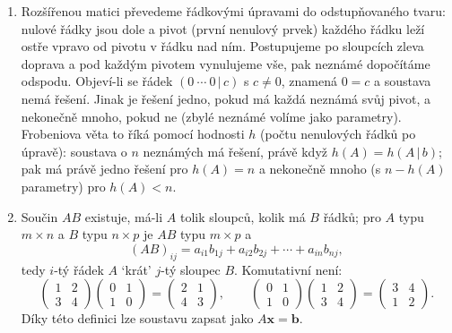\begin{enumerate}[label=\textbf{\arabic*.}, leftmargin=*, itemsep=0.8em]
  \item {}
  Rozšířenou matici převedeme řádkovými úpravami do odstupňovaného tvaru: nulové řádky jsou dole a pivot (první nenulový prvek) každého řádku leží ostře vpravo od pivotu v řádku nad ním. Postupujeme po sloupcích zleva doprava a pod každým pivotem vynulujeme vše, pak neznámé dopočítáme odspodu. Objeví-li se řádek $(0\ \cdots\ 0\,|\,c)$ s $c\neq 0$, znamená $0 = c$ a soustava nemá řešení. Jinak je řešení jedno, pokud má každá neznámá svůj pivot, a nekonečně mnoho, pokud ne (zbylé neznámé volíme jako parametry). Frobeniova věta to říká pomocí hodnosti $h$ (počtu nenulových řádků po úpravě): soustava o $n$ neznámých má řešení, právě když $h(A) = h(A\,|\,b)$; pak má právě jedno řešení pro $h(A) = n$ a nekonečně mnoho (s $n - h(A)$ parametry) pro $h(A) < n$. 

  \item {}
  Součin $AB$ existuje, má-li $A$ tolik sloupců, kolik má $B$ řádků; pro $A$ typu $m\times n$ a $B$ typu $n\times p$ je $AB$ typu $m\times p$ a
  \begin{equation*}
    (AB)_{ij} = a_{i1}b_{1j} + a_{i2}b_{2j} + \cdots + a_{in}b_{nj},
  \end{equation*}
  tedy $i$-tý řádek $A$ `krát' $j$-tý sloupec $B$. Komutativní není:
  \begin{equation*}
    \begin{pmatrix} 1 & 2\\ 3 & 4 \end{pmatrix}\begin{pmatrix} 0 & 1\\ 1 & 0 \end{pmatrix} = \begin{pmatrix} 2 & 1\\ 4 & 3 \end{pmatrix}, \qquad
    \begin{pmatrix} 0 & 1\\ 1 & 0 \end{pmatrix}\begin{pmatrix} 1 & 2\\ 3 & 4 \end{pmatrix} = \begin{pmatrix} 3 & 4\\ 1 & 2 \end{pmatrix}.
  \end{equation*}
  Díky této definici lze soustavu zapsat jako $A\mathbf{x} = \mathbf{b}$. 


\end{enumerate}
